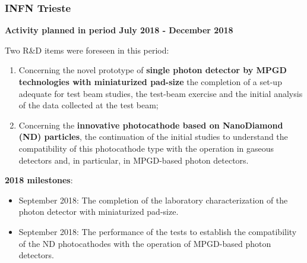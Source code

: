 \subsubsection{INFN Trieste} 
\textbf{Activity planned in 
period July 2018 - December 2018}
\par
Two R\&D items were foreseen in this period:
\begin{enumerate}
\item
Concerning  the novel prototype of 
\textbf{single photon detector by MPGD technologies with 
miniaturized 
pad-size} the completion  of 
a set-up adequate for test beam studies, the test-beam exercise and the initial analysis of the data collected at the test beam;
\item
Concerning  the \textbf{innovative photocathode 
based on NanoDiamond (ND) particles}, the continuation 
of the initial studies to understand the 
compatibility of this photocathode type with the 
operation in gaseous detectors and, in 
particular, in MPGD-based photon detectors.
\end{enumerate}
\textbf{2018 milestones}:
\begin{itemize}
\item
September 2018: The completion of the laboratory characterization 
of the photon detector with miniaturized
pad-size.
\item
September 2018: The performance of the tests to establish 
the compatibility of the ND photocathodes
with the operation of MPGD-based photon detectors.
\end{itemize}
